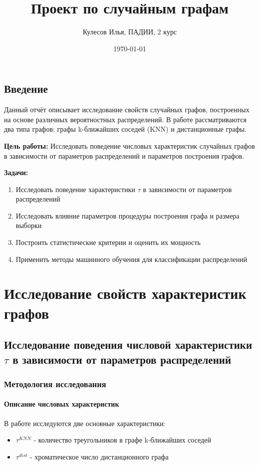 \documentclass[a4paper,12pt]{report}
\title{Проект по случайным графам}
\author{Кулесов Илья, ПАДИИ, 2 курс}
\date{\today}
\begin{document}
\maketitle

\tableofcontents

\chapter*{Введение}

Данный отчёт описывает исследование свойств случайных графов, построенных на основе различных вероятностных распределений. В работе рассматриваются два типа графов: графы k-ближайших соседей (KNN) и дистанционные графы.

\textbf{Цель работы:} Исследовать поведение числовых характеристик случайных графов в зависимости от параметров распределений и параметров построения графов.

\textbf{Задачи:}
\begin{enumerate}
    \item Исследовать поведение характеристики $\tau$ в зависимости от параметров распределений
    \item Исследовать влияние параметров процедуры построения графа и размера выборки
    \item Построить статистические критерии и оценить их мощность
    \item Применить методы машинного обучения для классификации распределений
\end{enumerate}

\part{Исследование свойств характеристик графов}

\chapter{Исследование поведения числовой характеристики $\tau$ в зависимости от параметров распределений}

\section{Методология исследования}

\subsection{Описание числовых характеристик}
В работе исследуются две основные характеристики:
\begin{itemize}
    \item $\tau^{KNN}$ - количество треугольников в графе k-ближайших соседей
    \item $\tau^{dist}$ - хроматическое число дистанционного графа
\end{itemize}
\end{document}
